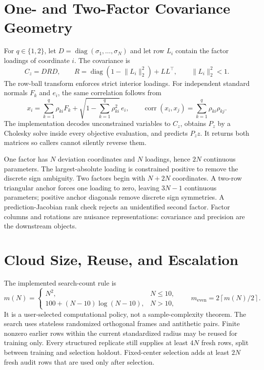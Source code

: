 \section{One- and Two-Factor Covariance Geometry}
\label{sec:bf-factor-correlation-geometry}

For $q\in\{1,2\}$, let $D=\operatorname{diag}(\sigma_1,\ldots,\sigma_N)$ and
let row $L_i$ contain the factor loadings of coordinate $i$.  The covariance is
\begin{equation}
  C_z=D R D,
  \qquad
  R=\operatorname{diag}\!\left(1-\lVert L_i\rVert_2^2\right)+LL^\top,
  \qquad \lVert L_i\rVert_2^2<1.
  \label{eq:bf-factor-correlation-covariance}
\end{equation}
The row-ball transform enforces strict interior loadings.  For independent
standard normals $F_k$ and $e_i$, the same correlation follows from
\begin{equation}
 x_i=\sum_{k=1}^{q}\rho_{ki}F_k+
 \sqrt{1-\sum_{k=1}^{q}\rho_{ki}^2}\,e_i,
 \qquad
 \operatorname{corr}(x_i,x_j)=
 \sum_{k=1}^{q}\rho_{ki}\rho_{kj}.
 \label{eq:bf-factor-correlation-identity}
\end{equation}
The implementation decodes unconstrained variables to $C_z$, obtains $P_z$ by
a Cholesky solve inside every objective evaluation, and predicts $P_z z$.  It
returns both matrices so callers cannot silently reverse them.

One factor has $N$ deviation coordinates and $N$ loadings, hence $2N$
continuous parameters.  The largest-absolute loading is constrained positive
to remove the discrete sign ambiguity.  Two factors begin with $N+2N$
coordinates.  A two-row triangular anchor forces one loading to zero, leaving
$3N-1$ continuous parameters; positive anchor diagonals remove discrete sign
symmetries.  A prediction-Jacobian rank check rejects an unidentified second
factor.  Factor columns and rotations are nuisance representations: covariance
and precision are the downstream objects.

\section{Cloud Size, Reuse, and Escalation}
\label{sec:bf-curvature-cloud-policy}

The implemented search-count rule is
\begin{equation}
 m(N)=
 \begin{cases}
   N^2, & N\leq 10,\\
   100+(N-10)\log(N-10), & N>10,
 \end{cases}
 \qquad
 m_{\mathrm{even}}=2\left\lceil m(N)/2\right\rceil .
 \label{eq:bf-dimension-scaled-cloud}
\end{equation}
It is a user-selected computational policy, not a sample-complexity theorem.
The search uses stateless randomized orthogonal frames and antithetic pairs.
Finite nonzero earlier rows within the current standardized radius may be
reused for training only.  Every structured replicate still supplies at least
$4N$ fresh rows, split between training and selection holdout.  Fixed-center
selection adds at least $2N$ fresh audit rows that are used only after selection.

